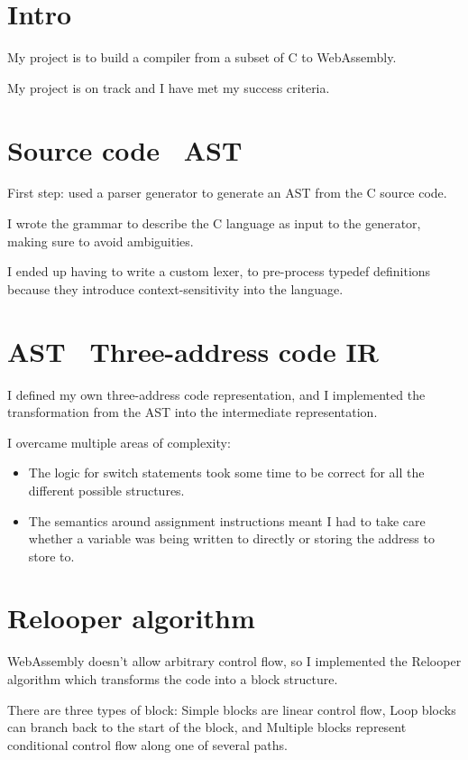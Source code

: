 \documentclass[12pt, a4paper]{article}
\begin{document}
\section*{Intro}


My project is to build a compiler from a subset of C to WebAssembly.

My project is on track and I have met my success criteria.

\section*{Source code \textrightarrow\ AST}

First step: used a parser generator to generate an AST from the C source code.

I wrote the grammar to describe the C language as input to the generator, making sure to avoid ambiguities.

I ended up having to write a custom lexer, to pre-process typedef definitions because they introduce context-sensitivity into the language.


\section*{AST \textrightarrow\ Three-address code IR}

I defined my own three-address code representation, and I implemented the transformation from the AST into the intermediate representation.

I overcame multiple areas of complexity:
\begin{itemize}
\item The logic for switch statements took some time to be correct for all the different possible structures.
\item The semantics around assignment instructions meant I had to take care whether a variable was being written to directly or storing the address to store to.
\end{itemize}


\section*{Relooper algorithm}

WebAssembly doesn't allow arbitrary control flow, so I implemented the Relooper algorithm which transforms the code into a block structure.

There are three types of block: Simple blocks are linear control flow, Loop blocks can branch back to the start of the block, and Multiple blocks represent conditional control flow along one of several paths.
\end{document}
